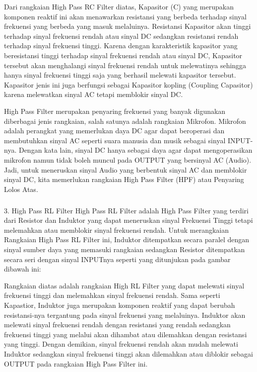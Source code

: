 \documentclass[12pt,a4paper]{article}
\begin{document}
Dari rangkaian High Pass RC Filter diatas, Kapasitor (C) yang merupakan komponen reaktif ini akan menawarkan resistansi yang berbeda terhadap sinyal frekuensi yang berbeda yang masuk melaluinya. Resistansi Kapasitor akan tinggi terhadap sinyal frekuensi rendah atau sinyal DC sedangkan resistansi rendah terhadap sinyal frekuensi tinggi. Karena dengan karakteristik kapasitor yang beresistansi tinggi terhadap sinyal frekuensi rendah atau sinyal DC, Kapasitor tersebut akan menghalangi sinyal frekuensi rendah untuk melewatinya sehingga hanya sinyal frekuensi tinggi saja yang berhasil melewati kapasitor tersebut. Kapasitor jenis ini juga berfungsi sebagai Kapasitor kopling (Coupling Capasitor) karena melewatkan sinyal AC tetapi memblokir sinyal DC.

High Pass Filter merupakan penyaring frekuensi yang banyak digunakan diberbagai jenis rangkaian, salah satunya adalah rangkaian Mikrofon. Mikrofon adalah perangkat yang memerlukan daya DC agar dapat beroperasi dan membutuhkan sinyal AC seperti suara manusia dan musik sebagai sinyal INPUT-nya. Dengan kata lain, sinyal DC hanya sebagai daya agar dapat mengoperasikan mikrofon namun tidak boleh muncul pada OUTPUT yang bersinyal AC (Audio). Jadi, untuk meneruskan sinyal Audio yang berbentuk sinyal AC dan memblokir sinyal DC, kita memerlukan rangkaian High Pass Filter (HPF) atau Penyaring Lolos Atas.

\subparagraph{ }
3. High Pass RL Filter
High Pass RL Filter adalah High Pass Filter yang terdiri dari Resistor dan Induktor yang dapat meneruskan sinyal Frekuensi Tinggi tetapi melemahkan atau memblokir sinyal frekuensi rendah. Untuk merangkaian Rangkaian High Pass RL Filter ini, Induktor ditempatkan secara paralel dengan sinyal sumber daya yang memasuki rangkaian sedangkan Resistor ditempatkan secara seri dengan sinyal INPUTnya seperti yang ditunjukan pada gambar dibawah ini:

Rangkaian diatas adalah rangkaian High RL Filter yang dapat melewati sinyal frekuensi tinggi dan melemahkan sinyal frekuensi rendah. Sama seperti Kapastior, Induktor juga merupakan komponen reaktif yang dapat berubah resistansi-nya tergantung pada sinyal frekuensi yang melaluinya. Induktor akan melewati sinyal frekuensi rendah dengan resistansi yang rendah sedangkan frekuensi tinggi yang melalui akan dihambat atau dilemahkan dengan resistansi yang tinggi. Dengan demikian, sinyal frekuensi rendah akan mudah melewati Induktor sedangkan sinyal frekuensi tinggi akan dilemahkan atau diblokir sebagai OUTPUT pada rangkaian High Pass Filter ini.
\end{document}
